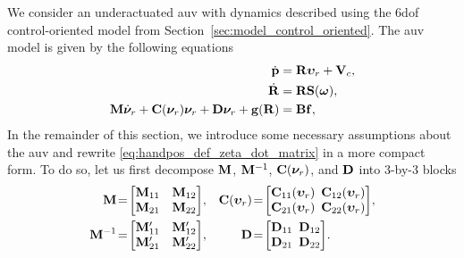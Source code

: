 We consider an underactuated \gls{auv} with dynamics described using the 6\gls{dof} control-oriented model from Section~\ref{sec:model_control_oriented}.
The \gls{auv} model is given by the following equations
\begin{subequations}
    \begin{align}
        \dot{\mathbf{p}} &= \mathbf{R}\bm{\upsilon}_r + \mathbf{V}_c, \\
        \dot{\mathbf{R}} &= \mathbf{R}\mathbf{S}(\bm{\omega}), \\
        \mathbf{M}\dot{\bm{\nu}}_r + \mathbf{C}(\bm{\nu}_r)\bm{\nu}_r + \mathbf{D}\bm{\nu}_r + \mathbf{g}(\mathbf{R}) &= \mathbf{B}\mathbf{f}, \label{eq:handpos_def_zeta_dot_matrix}
    \end{align}
\end{subequations}
In the remainder of this section, we introduce some necessary assumptions about the \gls{auv} and rewrite \eqref{eq:handpos_def_zeta_dot_matrix} in a more compact form.
To do so, let us first decompose $\mathbf{M}$, $\mathbf{M}^{-1}$, $\mathbf{C}(\bm{\nu}_r)$, and $\mathbf{D}$ into 3-by-3 blocks
\begin{subequations}
\begin{align}
    \mat{M}\! &=\! \begin{bmatrix}
        \mat{M}_{11} & \mat{M}_{12} \\ \mat{M}_{21} & \mat{M}_{22}
    \end{bmatrix}\!, &
    \mat{C}(\bvel_r)\! &=\! \begin{bmatrix}
        \mat{C}_{11}(\bvel_r)\!\!\! & \mat{C}_{12}(\bvel_r) \\ \mat{C}_{21}(\bvel_r)\!\!\! & \mat{C}_{22}(\bvel_r)
    \end{bmatrix}\!, \\
    \mat{M}^{-1}\! &=\! \begin{bmatrix}
        \mat{M}_{11}^{\prime} & \mat{M}_{12}^{\prime} \\ \mat{M}_{21}^{\prime} & \mat{M}_{22}^{\prime}
    \end{bmatrix}\!, &
    \mat{D}\! &=\! \begin{bmatrix}
        \mat{D}_{11}\!\!\! & \mat{D}_{12} \\ \mat{D}_{21}\!\!\! & \mat{D}_{22}
    \end{bmatrix}\!.
\end{align}
\end{subequations}

